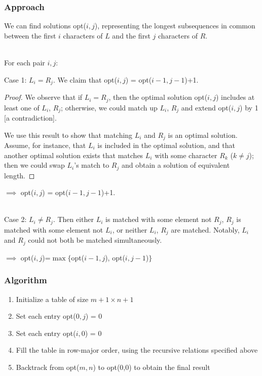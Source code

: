\documentclass[12pt]{extarticle}
\theoremstyle{definition}
\theoremstyle{remark}
\begin{document}
\begin{center}
\end{center}

\subsubsection*{Approach}
We can find solutions opt($i,j$), representing the longest subsequences in common between the first $i$ characters of $L$ and the first $j$ characters of $R$.

~\\
For each pair $i,j$:

\vspace{6pt}
\noindent Case 1: \ul{$L_i=R_j$}. We claim that opt($i,j$) = opt($i-1,j-1$)+1.
\begin{proof}
    We observe that if $L_i=R_j$, then the optimal solution opt($i,j$) includes at least one of $L_i$, $R_j$; otherwise, we could match up $L_i$, $R_j$ and extend opt($i,j$) by 1 [a contradiction].
    
    We use this result to show that matching $L_i$ and $R_j$ is an optimal solution. Assume, for instance, that $L_i$ is included in the optimal solution, and that another optimal solution exists that matches $L_i$ with some character $R_k$ ($k\neq j$); then we could swap $L_i$'s match to $R_j$ and obtain a solution of equivalent length. 
\end{proof}
\begin{center}
    $\implies$ opt($i,j$) = opt($i-1,j-1$)+1.
\end{center}

~\\
\noindent Case 2: \ul{$L_i\neq R_j$}. Then either $L_i$ is matched with some element not $R_j$, $R_j$ is matched with some element not $L_i$, or neither $L_i$, $R_j$ are matched. Notably, $L_i$ and $R_j$ could not both be matched simultaneously. \begin{center}
    $\implies$ opt($i,j$)=$\max\{$opt($i-1,j$), opt($i,j-1$)$\}$
\end{center}

\subsubsection*{Algorithm}
\begin{enumerate}
    \item Initialize a table of size $m+1\times n+1$
    \item Set each entry opt($0,j$) = 0
    \item Set each entry opt($i,0$) = 0
    \item Fill the table in row-major order, using the recursive relations specified above
    \item Backtrack from opt($m,n$) to opt(0,0) to obtain the final result
\end{enumerate}
\end{document}
